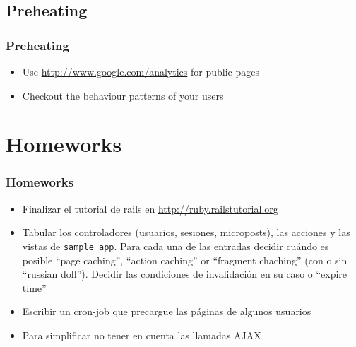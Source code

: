 \documentclass{beamer}
\begin{document}
\subsection{Preheating}
\begin{frame}[fragile]
\frametitle{Preheating}
\begin{itemize}
\item Use \url{http://www.google.com/analytics} for public pages
\item Checkout the behaviour patterns of your users 
\end{itemize}

\end{frame}



\section{Homeworks}
\begin{frame}[fragile]
\frametitle{Homeworks}
\begin{itemize}
\item Finalizar el tutorial de rails en \url{http://ruby.railstutorial.org}
\item Tabular los controladores (usuarios, sesiones, microposts), las acciones y las vistas de \texttt{sample\_app}. Para cada una de las entradas decidir cuándo es posible ``page caching'',
``action caching'' or ``fragment chaching'' (con o sin ``russian doll'').  Decidir las condiciones de invalidación en su caso o ``expire time''
\item Escribir un cron-job que precargue las páginas de algunos usuarios
\item Para simplificar no tener en cuenta las llamadas AJAX
\end{itemize}

\end{frame}
\end{document}
